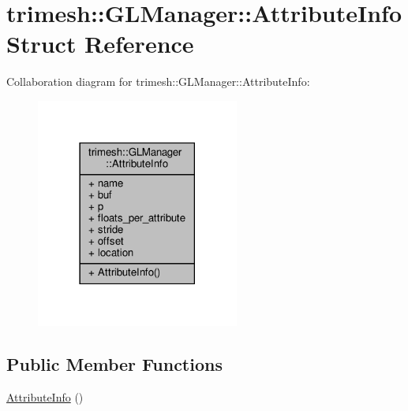 \hypertarget{structtrimesh_1_1GLManager_1_1AttributeInfo}{}\section{trimesh\+:\+:G\+L\+Manager\+:\+:Attribute\+Info Struct Reference}
\label{structtrimesh_1_1GLManager_1_1AttributeInfo}


Collaboration diagram for trimesh\+:\+:G\+L\+Manager\+:\+:Attribute\+Info\+:\nopagebreak
\begin{figure}[H]
\begin{center}
\leavevmode
\includegraphics[width=189pt]{d7/d44/structtrimesh_1_1GLManager_1_1AttributeInfo__coll__graph}
\end{center}
\end{figure}
\subsection*{Public Member Functions}
\begin{DoxyCompactItemize}
\item 
\hyperlink{structtrimesh_1_1GLManager_1_1AttributeInfo_aab13a2c3c0f74ace19e917547916724d}{Attribute\+Info} ()
\end{DoxyCompactItemize}
